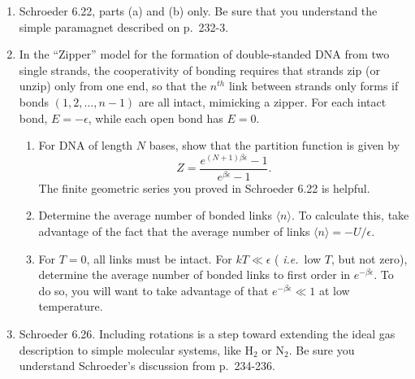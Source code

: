 \documentclass[12pt]{article}
\newenvironment{answer}[2][Solution]{\begin{trivlist}
\item[\hskip \labelsep {\bfseries #1}\hskip \labelsep {\bfseries #2.}]}{\end{trivlist}}
\begin{document}
\begin{enumerate}

\item Schroeder 6.22, parts (a) and (b) only.  Be sure that you understand
  the simple paramagnet described on p.\ 232-3.



\item In the ``Zipper'' model for the formation of double-standed DNA
  from two single strands, the cooperativity of bonding requires that
  strands zip (or unzip) only from one end, so that the $n^{th}$ link
  between strands only forms if bonds $(1, 2, \dots, n-1)$ are all
  intact, mimicking a zipper.  For each intact bond, $E = -\epsilon$,
  while each open bond has $E=0$.
\begin{enumerate}
\item For DNA of length $N$ bases, show that the partition function is given by
$$ {Z} = \frac{e^{(N+1)\beta\epsilon}-1}{e^{\beta\epsilon}-1}. $$
The finite geometric series you proved in Schroeder 6.22 is helpful.
\item Determine the average number of bonded links $\langle n \rangle$.
  To calculate this, take advantage of the fact that the average number
  of links $\langle n \rangle = -U/\epsilon$.
\item For $T=0$, all links must be intact.  For $kT \ll \epsilon$ ({\it
    i.e.}\ low $T$, but not zero), determine the average number of bonded
  links to first order in $e^{-\beta\epsilon}$.  To do so, you will want
  to take advantage of that $e^{-\beta\epsilon} \ll 1$ at low
  temperature.
\end{enumerate}

\item Schroeder 6.26.  Including rotations is a step toward extending
  the ideal gas description to simple molecular systems, like H$_2$ or
  N$_2$.  Be sure you understand Schroeder's discussion from p.\ 234-236.


\end{enumerate}
\end{document}

